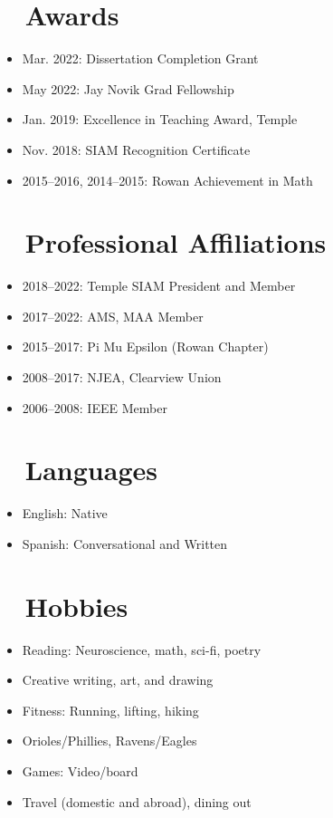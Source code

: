 \documentclass[11pt]{article}
\begin{document}
\section*{\faTrophy ~ Awards}
\begin{itemize}
    \item Mar. 2022: Dissertation Completion Grant
    \item May 2022: Jay Novik Grad Fellowship
    \item Jan. 2019: Excellence in Teaching Award, Temple
    \item Nov. 2018: SIAM Recognition Certificate
    \item 2015--2016, 2014--2015: Rowan Achievement in Math
\end{itemize}

\section*{\faUsers ~ Professional Affiliations}
\begin{itemize}
    \item 2018--2022: Temple SIAM President and Member
    \item 2017--2022: AMS, MAA Member
    \item 2015--2017: Pi Mu Epsilon (Rowan Chapter)
    \item 2008--2017: NJEA, Clearview Union
    \item 2006--2008: IEEE Member
\end{itemize}

\section*{\faLanguage ~ Languages}
\begin{itemize}
    \item English: Native
    \item Spanish: Conversational and Written
\end{itemize}

\section*{\faHeart ~ Hobbies}
\begin{itemize}
    \item Reading: Neuroscience, math, sci-fi, poetry
    \item Creative writing, art, and drawing
    \item Fitness: Running, lifting, hiking
    \item Orioles/Phillies, Ravens/Eagles
    \item Games: Video/board
    \item Travel (domestic and abroad), dining out
\end{itemize}
\end{document}
